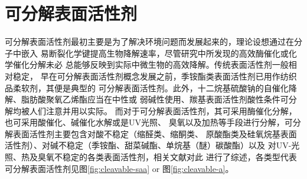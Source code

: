 \documentclass[bachelor,adobefonts]{jnuthesis} %
\begin{document}
    \section{可分解表面活性剂}
    可分解表面活性剂最初主要是为了解决环境问题而发展起来的，理论设想通过在分子中嵌入
    易断裂化学键提高生物降解速率，尽管研究中所发现的高效酶催化或化学催化分解未必
    总能够反映到实际中微生物的高效降解\cite{tehrani2007}。传统表面活性剂一般相对稳定，
    早在可分解表面活性剂概念发展之前，季铵酯类表面活性剂已用作纺织品柔软剂，其便是典型的
    可分解表面活性剂。此外，十二烷基硫酸钠的自催化降解、脂肪酸聚氧乙烯酯应当在中性或
    弱碱性使用、羰基表面活性剂酸性条件可分解均被人们注意并用以实际\cite{tehrani2007}。
    而对于可分解表面活性剂，其可采用酶催化分解，也可采用酸催化、碱催化水解或是UV光照、
    臭氧以及加热等手段进行分解，可分解表面活性剂主要包含对酸不稳定（缩醛类、缩酮类、
    原酸酯类及硅氧烷基表面活性剂）、对碱不稳定（季铵酯、甜菜碱酯、单烷基（醚）碳酸酯）以及
    对UV-光照、热及臭氧不稳定的各类表面活性剂，相关文献\cite{hellberg2000,tehrani2007,shukla2010,narayanan2008}对此
    进行了综述，各类型代表可分解表面活性剂见图\ref{fig:cleavable-saa} or 图\ref{fig:cleavable-a}。
    
    
\end{document}
